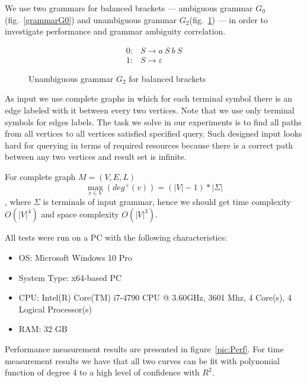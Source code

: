 We use two grammars for balanced brackets --- ambiguous grammar $G_0$(fig.~\ref{grammarG0}) and unambiguous grammar $G_2$(fig.~\ref{grammarG2}) --- in order to investigate performance and grammar ambiguity correlation.

\begin{figure}[ht]
   \begin{center}
   \[
\begin{array}{rl}
   0: & S \rightarrow a \ S \ b \ S \\ 
   1: & S \rightarrow \varepsilon
\end{array}
\]
   \caption{Unambiguous grammar $G_2$ for balanced brackets}
   \label{grammarG2}        
   \end{center}
\end{figure}

As input we use complete graphs in which for each terminal symbol there is an edge labeled with it between every two vertices.
Note that we use only terminal symbols for edges labels.  
The task we solve in our experiments is to find all paths from all vertices to all vertices satisfied specified query.
Such designed input looks hard for querying in terms of required resources because there is a correct path between any two vertices and result set is infinite.

For complete graph $M=(V,E,L)$ $$\max\limits_{v \in V}\left(deg^+\left(v\right)\right) = (|V| - 1)*|\Sigma|$$, where $\Sigma$ is terminals of input grammar, hence we should get time complexity $O(|V|^4)$ and space complexity $O(|V|^3)$.

All tests were run on a PC with the following characteristics:
\begin{itemize}
\item OS: Microsoft Windows 10 Pro
\item System Type: x64-based PC
\item CPU: Intel(R) Core(TM) i7-4790 CPU @ 3.60GHz, 3601 Mhz, 4 Core(s), 4 Logical Processor(s)
\item RAM: 32 GB
\end{itemize}

Performance measurement results are presented in figure~\ref{pic:Perf}. 
For time measurement results we have that all two curves can be fit with polynomial function of degree 4 to a high level of confidence with $R^2$. 


